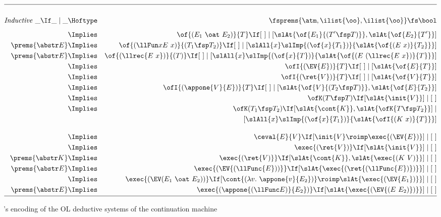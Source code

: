 \documentclass[final]{svjour3}
\begin{document}
\begin{figure}[ht]
\begin{eqnarray*}
\hline \\[.5ex]
 \mathit{Inductive}\ \sbc{\_}{\_}{\_} &\Hoftype&  \fsprems{\atm, \ilist{\oo},
    \ilist{\oo}}\fs \bool\\[0.5em]
&\Implies & \sbc{\of{(E_1\ \oat\ E_2)}{T}}{\elist}{
 [{\slAt{\of{E_1}{(T'\fsp T)}}}, {\slAt{\of{E_2}{T'}}}]}\\
\prems {\abstr E } &\Implies & \sbc{\of{(\llFun x {E\ x}) }{( T_1 \fsp
 T_2)}}{\elist}{[\slAll {x}\slImp{(\of{x}{T_1})} {\slAt{\of{(E\
 x)}{T_2}}}]}\\
\prems {\abstr E } &\Implies & \sbc{\of{(\llrec {E \ x}) }{( T)}}{\elist}{[\slAll {x}\slImp{(\of{x}{T})}  {\slAt{\of{(E\
 (\llrec {E\ x})}{T}}}]}\\
&\Implies & \sbc{\ofI{(\EV{E})}{T}}{\elist}{[\slAt{\of{E}{T}}]}\\
&\Implies & \sbc{\ofI{(\ret{V})}{T}}{\elist}{[\slAt{\of{V}{T}}]}\\
&\Implies & \sbc{\ofI{(\appone{V}{E})}{T}}{\elist}{[\slAt{\of{V}{( T_2\fsp T)}},
\slAt{\of{E}{T_2}}]}\\
&\Implies & \sbc{\ofK (T \fsp T)}{[\slAt{\init {V}}]}{\elist}\\
 &\Implies & \sbc{\ofK (T_1 \fsp T_2)}{[{\slAt{\cont
    {K}}}, {\slAt{\ofK {T\fsp T_2}}}]} \\
&& \qquad\qquad\qquad\qquad\quad\ \
{[\slAll {x}\slImp{(\of{x}{T_1})} {\slAt{\ofI{(K\ x)}{T}}}]}\\[1em]
&\Implies & \sbc{\ceval {E}{V}}{[\init {V}\roimp\exec {(\EV {E})}]}{\elist}\\
&\Implies &  \sbc{\exec{(\ret{V})}}{[\slAt{\init {V} } ]} {\elist}\\
\prems {\abstr K } &\Implies & \sbc{\exec{(\ret{V) }}}
{[{\slAt{\cont {K}}}, {\slAt{\exec{(K\ V)}}}]} {\elist} \\
\prems {\abstr E } &\Implies & \sbc{\exec{(\EV{(\llFunc {E}))}}}
        {[\slAt{\exec{(\ret{(\llFunc {E})})} }]}{\elist}\\
&\Implies &  \sbc{\exec{(\EV (E_1\ \oat\ E_2)) }}
 {[ \cont {(\lambda v.\ \appone{v}{E_2})} \roimp \slAt{\exec{( \EV{E_1})}}]} {\elist}\\
\prems {\abstr E } &\Implies & \sbc{\exec{(\appone{(\llFunc E)}{E_2}) }}
{[\slAt{\exec{( \EV {(E\ E_2)})}}]} {\elist}
 \\[.5ex]\hline
\end{eqnarray*}
\caption{\hybrid's encoding of  the OL deductive systems of the
  continuation machine\label{fig:tph}}
\end{figure}
\end{document}
